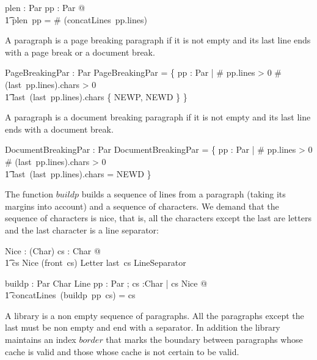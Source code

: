 \documentclass{article}
\begin{document}
\begin{axdef}
	plen : Par \fun \nat
\where
	\forall pp : Par @ \\
	\t1 plen~pp = \# (concatLines~pp.lines)
\end{axdef}

A paragraph is a page breaking paragraph if it is not empty and its last line ends with a page break or a document break.

\begin{axdef}
	PageBreakingPar : \power Par
\where
	PageBreakingPar = \{ pp : Par | \# pp.lines > 0 \land \# (last~pp.lines).chars > 0 \land {} \\
	\t1 last~(last~pp.lines).chars \in \{ NEWP, NEWD \} \}
\end{axdef}

A paragraph is a document breaking paragraph if it is not empty and its last line ends with a document break.

\begin{axdef}
	DocumentBreakingPar : \power Par
\where
	DocumentBreakingPar = \{ pp : Par | \# pp.lines > 0 \land \# (last~pp.lines).chars > 0 \land {} \\
	\t1 last~(last~pp.lines).chars = NEWD \}
\end{axdef}

The function $buildp$ builds a sequence of lines from a paragraph (taking its margins into account) and a sequence of characters. We demand that the sequence of characters is nice, that is, all the characters except the last are letters and the last character is a line separator:

\begin{axdef}
	Nice : \power (\seq Char) 
\where
	\forall cs : \seq Char @ \\
	\t1 cs \in Nice \iff \ran (front~cs) \subseteq Letter \land last~cs \in LineSeparator
\end{axdef}

\begin{axdef}
	buildp : Par \fun \seq Char \pfun \seq Line
\where
	\forall pp : Par ; cs :\seq Char | cs \in Nice @ \\
	\t1 concatLines~(buildp~pp~cs) = cs 
\end{axdef}

A library is a non empty sequence of paragraphs. All the paragraphs except the last must be non empty and end with a separator. In addition the library maintains an index $border$ that marks the boundary between paragraphs whose cache is valid and those whose cache is not certain to be valid. 
\end{document}
